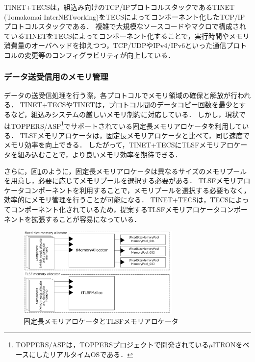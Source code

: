 \documentclass[submit,techrep]{ipsj_v2/UTF8/ipsj}
\begin{document}
TINET+TECSは，組込み向けのTCP/IPプロトコルスタックであるTINET (Tomakomai InterNETworking)\cite{url:TINET}\cite{par:TINET}をTECSによってコンポーネント化したTCP/IPプロトコルスタックである\cite{par:TINET+TECS}．
複雑で大規模なソースコードやマクロで構成されているTINETをTECSによってコンポーネント化することで，実行時間やメモリ消費量のオーバヘッドを抑えつつ，TCP/UDPやIPv4/IPv6といった通信プロトコルの変更等のコンフィグラビリティが向上している．

\subsubsection{データ送受信用のメモリ管理}

データの送受信処理を行う際，各プロトコルでメモリ領域の確保と解放が行われる．
TINET+TECSやTINETは，プロトコル間のデータコピー回数を最少とするなど，組込みシステムの厳しいメモリ制約に対応している．
しかし，現状ではTOPPERS/ASP\footnote{TOPPERS/ASPは，TOPPERSプロジェクトで開発されている$\mu$ITRON\cite{par:microITRON}をベースにしたリアルタイムOSである．}でサポートされている固定長メモリアロケータを利用している．
TLSFメモリアロケータは，固定長メモリアロケータと比べて，同じ速度でメモリ効率を向上できる．
したがって，TINET+TECSにTLSFメモリアロケータを組み込むことで，より良いメモリ効率を期待できる．

さらに，図\ref{fig:UseCase_TINET}のように，固定長メモリアロケータは異なるサイズのメモリプールを用意し，必要に応じてメモリプールを選択する必要がある．
TLSFメモリアロケータコンポーネントを利用することで，メモリプールを選択する必要もなく，効率的にメモリ管理を行うことが可能になる．
TINET+TECSは，TECSによってコンポーネント化されているため，提案するTLSFメモリアロケータコンポーネントを拡張することが容易になっている．

\begin{figure}[t]
    \centering
    \includegraphics[width=8cm,clip]{figure/UseCase_TINET.pdf}
    \caption{固定長メモリアロケータとTLSFメモリアロケータ}
    \label{fig:UseCase_TINET}
\end{figure}
    
\end{document}
